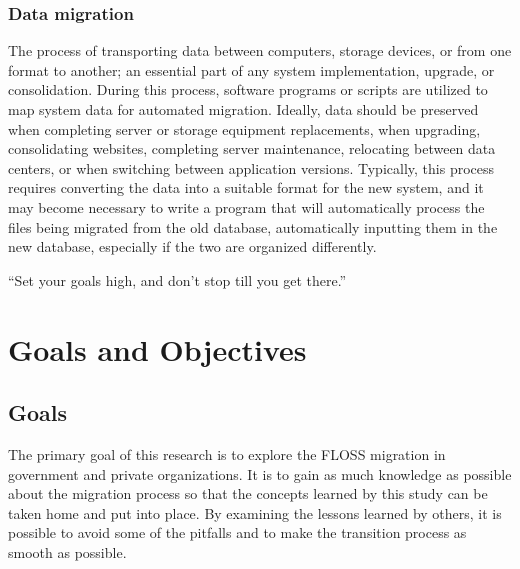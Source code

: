    \subsection*{Data migration}
   The process of transporting data between computers, storage devices, or from one format to another; an essential part of any system implementation, upgrade, or consolidation. During this process, software programs or scripts are utilized to map system data for automated migration. Ideally, data should be preserved when completing server or storage equipment replacements, when upgrading, consolidating websites, completing server maintenance, relocating between data centers, or when switching between application versions. Typically, this process requires converting the data into a suitable format for the new system, and it may become necessary to write a program that will automatically process the files being migrated from the old database, automatically inputting them in the new database, especially if the two are organized differently. 

      \cleardoublepage


      \begin{savequote}[108mm]
       ``Set your goals high, and don't stop till you get there.''
      \end{savequote}

      \chapter{Goals and Objectives}
      \vspace{-3cm}
      \label{chap:Goals}




\section{Goals} 

The primary goal of this research is to explore the FLOSS migration in government and private organizations. It is to gain as much knowledge as possible about the migration process so that the concepts learned by this study can be taken home and put into place. By examining the lessons learned by others, it is possible to avoid some of the pitfalls and to make the transition process as smooth as possible.          
                                                                                        
